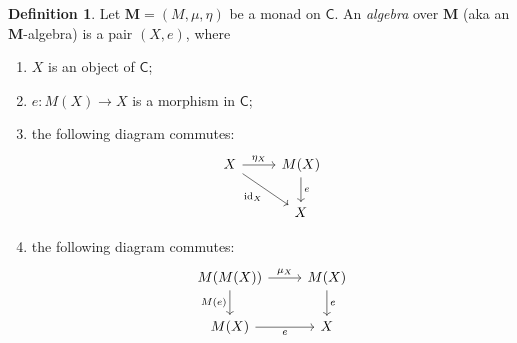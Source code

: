 \documentclass{article}
\theoremstyle{definition}
\newtheorem{defn}{Definition}
\newcommand{\C}{\mathsf{C}}
\DeclareMathOperator{\id}{id}
\begin{document}
\begin{defn}
Let $\mathbf{M} = (M,\mu,\eta)$ be a monad on $\C$. An \emph{algebra} over $\mathbf{M}$ (aka an $\mathbf{M}$-algebra) is a pair $(X,e)$, where
\begin{enumerate}[label = (\roman*.)]
    \item $X$ is an object of $\C$;
    \item $e : M(X) \to X$ is a morphism in $\C$;
    \item the following diagram commutes:
    \[\begin{tikzcd}[ampersand replacement=\&]
    	X \& {M(X)} \\
    	\& X
    	\arrow["{\eta_X}", from=1-1, to=1-2]
    	\arrow["e", from=1-2, to=2-2]
    	\arrow["{\id_X}"', from=1-1, to=2-2]
    \end{tikzcd}\]
    \item the following diagram commutes:
    \[\begin{tikzcd}[ampersand replacement=\&]
    	{M(M(X))} \& {M(X)} \\
    	{M(X)} \& X
    	\arrow["{\mu_X}", from=1-1, to=1-2]
    	\arrow["e", from=1-2, to=2-2]
    	\arrow["{M(e)}"', from=1-1, to=2-1]
    	\arrow["e"', from=2-1, to=2-2]
    \end{tikzcd}\]
\end{enumerate}
\end{defn}
\end{document}

